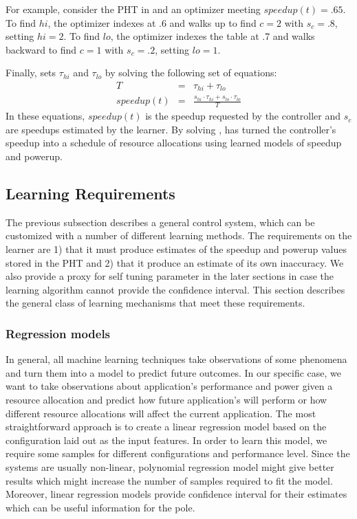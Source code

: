 For example, consider the PHT in  and an optimizer
meeting $speedup(t) = .65$.  To find $hi$, the optimizer indexes at .6
and walks up to find $c=2$ with $s_c=.8$, setting $hi = 2$.  To find
$lo$, the optimizer indexes the table at .7 and walks backward to find
$c=1$ with $s_c=.2$, setting $lo = 1$.

Finally, \SYSTEM{} sets $\tau_{hi}$ and $\tau_{lo}$ by solving the
following set of equations:
\begin{eqnarray}
  T &=& \tau_{hi} + \tau_{lo}    \label{eqn:s1} \\
  speedup(t) &=& \frac{s_{hi} \cdot \tau_{hi} + s_{lo} \cdot \tau_{lo}}{T} \label{eqn:s2}
\end{eqnarray}
In these equations, $speedup(t)$ is the speedup requested by the
controller and $s_c$ are speedups estimated by the learner.  By
solving , \SYSTEM{} has turned the controller's
speedup into a schedule of resource allocations using learned models
of speedup and powerup.

\subsection{\SYSTEM{} Learning Requirements}
The previous subsection describes a general control system, which can
be customized with a number of different learning methods.  The
requirements on the learner are 1) that it must produce estimates of
the speedup and powerup values stored in the PHT and 2) that it
produce an estimate of its own inaccuracy. We also provide a proxy for self tuning parameter in the later sections in case the learning algorithm cannot provide the confidence interval. This section describes the
general class of learning mechanisms that meet these requirements.

\subsubsection{Regression models}
In general, all machine learning techniques take observations of some
phenomena and turn them into a model to predict future outcomes.  In
our specific case, we want to take observations about application's
performance and power given a resource allocation and predict how
future application's will perform or how different resource
allocations will affect the current application. The most straightforward approach 
is to create a linear regression model based on the configuration laid 
out as the input features. In order to learn this model, we require some samples
for different configurations and performance level. Since the systems are usually non-linear,
polynomial regression model might give better results which might increase the number of samples
required to fit the model. Moreover, linear regression models provide confidence interval for their estimates 
which can be useful information for the pole.

